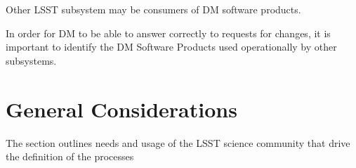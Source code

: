 Other LSST subsystem may be consumers of DM software products.

In order for DM to be able to answer correctly to requests for changes,
it is important to identify the DM Software Products used operationally by other subsystems.

\newpage
\section{General Considerations} \label{sec:considerations}

The section outlines needs and usage of the LSST science community that drive the definition of the processes
